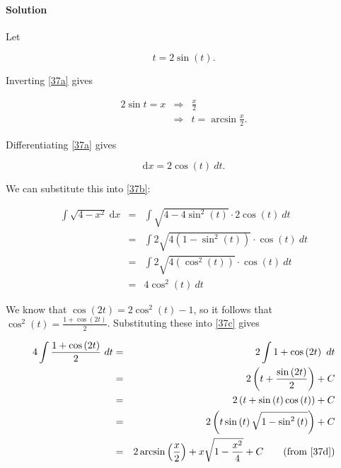 
\paragraph{Solution} 

Let

\begin{equation}
	t=2\sin\left(t\right)\label{37a}.
\end{equation}

Inverting \ref{37a} gives

\begin{eqnarray}
	2\sin t=x&\Rightarrow&\frac{x}{2}\nonumber\\
	&\Rightarrow&t=\arcsin\frac{x}{2}.\label{37d}
\end{eqnarray}

Differentiating \ref{37a} gives

\[\mbox{d}x=2\cos\left(t\right)~dt.\]

We can substitute this into \ref{37b}:

\begin{eqnarray}
	\int\sqrt{4-x^2}~\mbox{d}x&=&\int\sqrt{4-4\sin^2\left(t\right)}\cdot2\cos\left(t\right)~dt\nonumber\\
	&=&\int2\sqrt{4\left(1-\sin^2\left(t\right)\right)}\cdot\cos\left(t\right)~dt\nonumber\\
	&=&\int2\sqrt{4\left(\cos^2\left(t\right)\right)}\cdot\cos\left(t\right)~dt\nonumber\\
	&=&4\cos^2\left(t\right)~dt\label{37c}
\end{eqnarray}

We know that $\cos\left(2t\right)=2\cos^2\left(t\right)-1$, so it follows that $\cos^2\left(t\right)=\frac{1+\cos\left(2t\right)}{2}$. Substituting these into \ref{37c} gives

\begin{eqnarray*}
	4\int\frac{1+\cos\left(2t\right)}{2}~dt&=&2\int1+\cos\left(2t\right)~dt\\
	&=&2\left(t+\frac{\sin\left(2t\right)}{2}\right)+C\\
	&=&2\left(t+\sin\left(t\right)\cos\left(t\right)\right)+C\\
	&=&2\left(t\sin\left(t\right)\sqrt{1-\sin^2\left(t\right)}\right)+C\\
	&=&2\arcsin\left(\frac{x}{2}\right)+x\sqrt{1-\frac{x^2}{4}}+C\qquad\mbox{(from \ref{37d})}
\end{eqnarray*}
